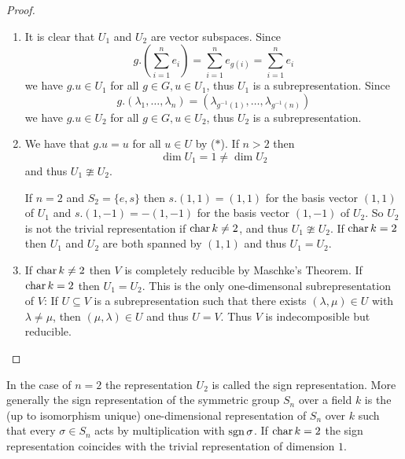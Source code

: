 \begin{proof}
  \begin{enumerate}[label=\emph{\alph*)},leftmargin=*]
    \item
      It is clear that $U_1$ and $U_2$ are vector subspaces. Since
      \[
          g.\left(\sum_{i=1}^n e_i\right)
        = \sum_{i=1}^n e_{g(i)}
        = \sum_{i=1}^n e_i
          \tag{$\ast$}
      \]
      we have $g.u \in U_1$ for all $g \in G, u \in U_1$, thus $U_1$ is a subrepresentation. Since
      \[
          g.(\lambda_1, \dotsc, \lambda_n)
        = \left( \lambda_{g^{-1}(1)}, \dotsc, \lambda_{g^{-1}(n)} \right)
      \]
      we have $g.u \in U_2$ for all $g \in G, u \in U_2$, thus $U_2$ is a subrepresentation.
    \item
      We have that $g.u = u$ for all $u \in U$ by ($\ast$).
      If $n > 2$ then
      \[
              \dim U_1
        =     1
        \neq  \dim U_2
      \]
      and thus $U_1 \ncong U_2$.
      
      If $n = 2$ and $S_2 = \{e,s\}$ then $s.(1,1) = (1,1)$ for the basis vector $(1,1)$ of $U_1$ and $s.(1,-1) = -(1,-1)$ for the basis vector $(1,-1)$ of $U_2$.
      So $U_2$ is not the trivial representation if $\operatorname{char} k \neq 2$, and thus $U_1 \ncong U_2$.
      If $\operatorname{char} k = 2$ then $U_1$ and $U_2$ are both spanned by $(1,1)$ and thus $U_1 = U_2$.
    \item
      If $\operatorname{char} k \neq 2$ then $V$ is completely reducible by Maschke’s Theorem.
      If $\operatorname{char} k = 2$ then $U_1 = U_2$.
      This is the only one-dimensonal subrepresentation of $V$:
      If $U \subseteq V$ is a subrepresentation such that there exists $(\lambda, \mu) \in U$ with $\lambda \neq \mu$, then $(\mu, \lambda) \in U$ and thus $U = V$.
      Thus $V$ is indecomposible but reducible.
    \qedhere
  \end{enumerate}
\end{proof}


\begin{remark}
  In the case of $n = 2$ the representation $U_2$ is called the sign representation.
  More generally the sign representation of the symmetric group $S_n$ over a field $k$ is the (up to isomorphism unique) one-dimensional representation of $S_n$ over $k$ such that every $\sigma \in S_n$ acts by multiplication with $\operatorname{sgn} \sigma$.
  If $\operatorname{char} k = 2$ the sign representation coincides with the trivial representation of dimension $1$.
\end{remark}




